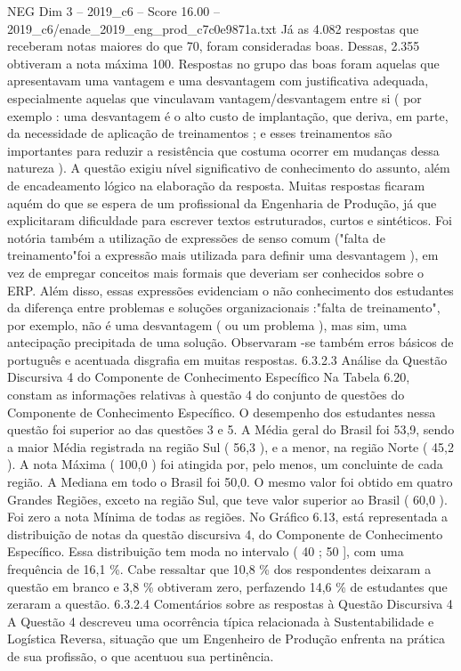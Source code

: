 \begin{textsample}{NEG Dim 3 – 2019\_c6 – Score 16.00 – 2019\_c6/enade\_2019\_eng\_prod\_c7c0e9871a.txt}
Já as 4.082 respostas que receberam notas maiores do que 70, foram consideradas boas.
Dessas, 2.355 obtiveram a nota máxima 100.
Respostas no grupo das boas foram aquelas que apresentavam uma vantagem e uma desvantagem com justificativa adequada, especialmente aquelas que vinculavam vantagem/desvantagem entre si ( por exemplo : uma desvantagem é o alto custo de implantação, que deriva, em parte, da necessidade de aplicação de treinamentos ; e esses treinamentos são importantes para reduzir a resistência que costuma ocorrer em mudanças dessa natureza ).
A questão exigiu nível significativo de conhecimento do assunto, além de encadeamento lógico na elaboração da resposta.
Muitas respostas ficaram aquém do que se espera de um profissional da Engenharia de Produção, já que explicitaram dificuldade para escrever textos estruturados, curtos e sintéticos.
Foi notória também a utilização de expressões de senso comum ("falta de treinamento"foi a expressão mais utilizada para definir uma desvantagem ), em vez de empregar conceitos mais formais que deveriam ser conhecidos sobre o ERP.
Além disso, essas expressões evidenciam o não conhecimento dos estudantes da diferença entre problemas e soluções organizacionais :"falta de treinamento", por exemplo, não é uma desvantagem ( ou um problema ), mas sim, uma antecipação precipitada de uma solução.
Observaram -se também erros básicos de português e acentuada disgrafia em muitas respostas. 6.3.2.3 Análise da Questão Discursiva 4 do Componente de Conhecimento Específico Na Tabela 6.20, constam as informações relativas à questão 4 do conjunto de questões do Componente de Conhecimento Específico.
O desempenho dos estudantes nessa questão foi superior ao das questões 3 e 5.
A Média geral do Brasil foi 53,9, sendo a maior Média registrada na região Sul ( 56,3 ), e a menor, na região Norte ( 45,2 ).
A nota Máxima ( 100,0 ) foi atingida por, pelo menos, um concluinte de cada região.
A Mediana em todo o Brasil foi 50,0.
O mesmo valor foi obtido em quatro Grandes Regiões, exceto na região Sul, que teve valor superior ao Brasil ( 60,0 ).
Foi zero a nota Mínima de todas as regiões.
No Gráfico 6.13, está representada a distribuição de notas da questão discursiva 4, do Componente de Conhecimento Específico.
Essa distribuição tem moda no intervalo ( 40 ; 50 ], com uma frequência de 16,1 \%.
Cabe ressaltar que 10,8 \% dos respondentes deixaram a questão em branco e 3,8 \% obtiveram zero, perfazendo 14,6 \% de estudantes que zeraram a questão. 6.3.2.4 Comentários sobre as respostas à Questão Discursiva 4 A Questão 4 descreveu uma ocorrência típica relacionada à Sustentabilidade e Logística Reversa, situação que um Engenheiro de Produção enfrenta na prática de sua profissão, o que acentuou sua pertinência.

\end{textsample}
